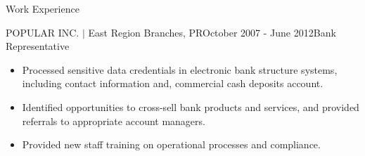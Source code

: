 \documentclass{resume} %
\begin{document}
\begin{rSection}{Work Experience}
\begin{rSubsection}{POPULAR INC. $\vert$ East Region Branches, PR}{October 2007
    - June 2012}{Bank Representative}{\space}
\begin{itemize}
\item Processed sensitive data credentials in electronic bank structure systems,
  including contact information and, commercial cash deposits account.

\item Identified opportunities to cross-sell bank products and services, and
  provided referrals to appropriate account managers.

\item Provided new staff training on operational processes and compliance.

\end{itemize}

\end{rSubsection}


\end{rSection}



\end{document}
